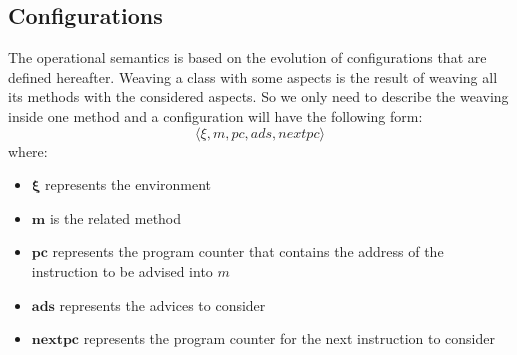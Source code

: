 \subsection{Configurations}
The operational semantics is based on the evolution of configurations that are defined hereafter. Weaving a class with some aspects is the result of weaving all its methods with the considered aspects. So we only need to describe the weaving inside one method and a configuration will have the following form:
$$\langle\xi,m,pc,ads,nextpc\rangle$$
where:
\begin{itemize}
  \item $\mathbf{\xi}$ represents the environment
  \item $\mathbf{m}$ is the related method
  \item $\mathbf{pc}$ represents the program counter that contains the address of the instruction to be advised into $m$
  \item $\mathbf{ads}$ represents the advices to consider
  \item $\mathbf{nextpc}$ represents the program counter for the next instruction to consider
\end{itemize}